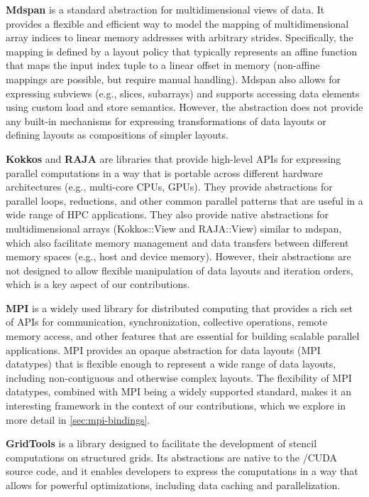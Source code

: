\textbf{Mdspan} is a \cpp standard abstraction for multidimensional views of data. It provides a flexible and efficient way to model the mapping of multidimensional array indices to linear memory addresses with arbitrary strides. Specifically, the mapping is defined by a layout policy that typically represents an affine function that maps the input index tuple to a linear offset in memory (non-affine mappings are possible, but require manual handling). Mdspan also allows for expressing subviews (e.g., slices, subarrays) and supports accessing data elements using custom load and store semantics. However, the abstraction does not provide any built-in mechanisms for expressing transformations of data layouts or defining layouts as compositions of simpler layouts.

\textbf{Kokkos} and \textbf{RAJA} are \cpp libraries that provide high-level APIs for expressing parallel computations in a way that is portable across different hardware architectures (e.g., multi-core CPUs, GPUs). They provide abstractions for parallel loops, reductions, and other common parallel patterns that are useful in a wide range of HPC applications. They also provide native abstractions for multidimensional arrays (Kokkos::View and RAJA::View) similar to mdspan, which also facilitate memory management and data transfers between different memory spaces (e.g., host and device memory). However, their abstractions are not designed to allow flexible manipulation of data layouts and iteration orders, which is a key aspect of our contributions.

\textbf{MPI} is a widely used library for distributed computing that provides a rich set of APIs for communication, synchronization, collective operations, remote memory access, and other features that are essential for building scalable parallel applications. MPI provides an opaque abstraction for data layouts (MPI datatypes) that is flexible enough to represent a wide range of data layouts, including non-contiguous and otherwise complex layouts. The flexibility of MPI datatypes, combined with MPI being a widely supported standard, makes it an interesting framework in the context of our contributions, which we explore in more detail in \cref{sec:mpi-bindings}.

\textbf{GridTools} is a \cpp library designed to facilitate the development of stencil computations on structured grids. Its abstractions are native to the \cpp/CUDA source code, and it enables developers to express the computations in a way that allows for powerful optimizations, including data caching and parallelization.

